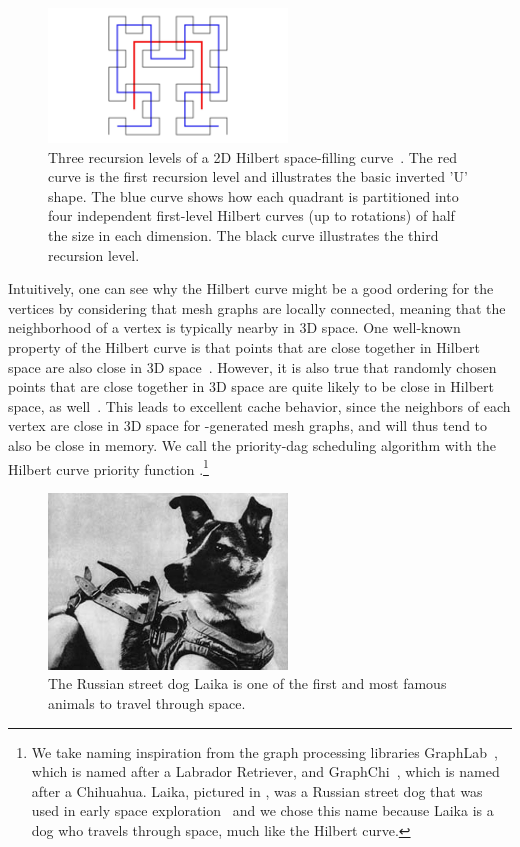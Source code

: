 \begin{figure}
\centering
\includegraphics[width=2.5in,clip,trim=4cm 0cm 4cm 0]{figures/2d_hilbert.pdf}
\caption{Three recursion levels of a 2D Hilbert space-filling
curve~\cite{Hilbert70}.  The red curve is the first recursion level and illustrates 
the basic inverted 'U' shape.  The blue curve shows how each quadrant is
partitioned into four independent first-level Hilbert curves (up to 
rotations) of half the size in each dimension.  The black curve
illustrates the third recursion level.}
\label{fig:2d_hilbert}
\end{figure}



Intuitively, one can see why the Hilbert curve might be a good
ordering for the vertices by considering that mesh graphs
are locally connected, meaning that the neighborhood of a vertex
is typically nearby in 3D space.  One well-known property
of the Hilbert curve is that points that are close together
in Hilbert space are also close in 3D space~\cite{GotsmanLi96}.  
However, it is also
true that randomly chosen points that are close together in 
3D space are quite likely to be close in Hilbert space, 
as well~\cite{MoonJaFa96,TirthapuraSeAl06}.
This leads to excellent cache behavior, since the neighbors of
each vertex are close in 3D space for -generated mesh graphs,
and will thus tend to also be close in memory.  We call the
priority-dag scheduling algorithm with the Hilbert curve priority
function .\footnote{We take naming inspiration from the
graph processing libraries GraphLab~\cite{LowBiGo12},
which is named after a Labrador Retriever, and 
GraphChi~\cite{KyrolaBlGu12}, which
is named after a Chihuahua.  Laika, pictured in , 
was a Russian street dog that was used in early space 
exploration~\cite{NYT57} and we chose this name
because Laika is a dog who travels through space, much like the Hilbert
curve.}

\begin{figure}
\centering
\includegraphics[width=2.5in]{figures/laika.jpg}
\caption{The Russian street dog Laika is one of the first and 
most famous animals to travel through space.}
\label{fig:laika}
\end{figure}



